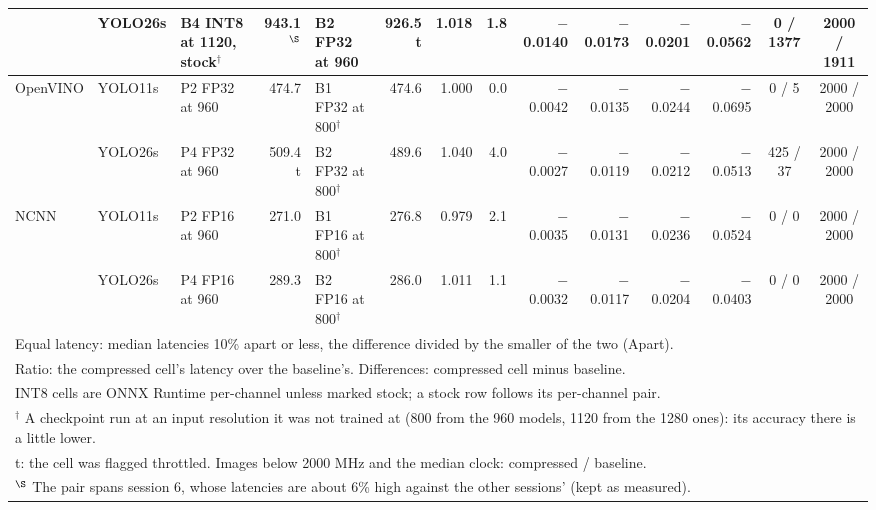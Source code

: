 \begin{tabular}{lllrlrrrrrrrcc}
 & YOLO26s & B4 INT8 at 1120, stock$^{\dagger}$ & 943.1$^{\S}$ & B2 FP32 at 960 & 926.5 t & 1.018 & 1.8 & $-$0.0140 & $-$0.0173 & $-$0.0201 & $-$0.0562 & 0 / 1377 & 2000 / 1911 \\
\midrule
OpenVINO & YOLO11s & P2 FP32 at 960 & 474.7 & B1 FP32 at 800$^{\dagger}$ & 474.6 & 1.000 & 0.0 & $-$0.0042 & $-$0.0135 & $-$0.0244 & $-$0.0695 & 0 / 5 & 2000 / 2000 \\
 & YOLO26s & P4 FP32 at 960 & 509.4 t & B2 FP32 at 800$^{\dagger}$ & 489.6 & 1.040 & 4.0 & $-$0.0027 & $-$0.0119 & $-$0.0212 & $-$0.0513 & 425 / 37 & 2000 / 2000 \\
\midrule
NCNN & YOLO11s & P2 FP16 at 960 & 271.0 & B1 FP16 at 800$^{\dagger}$ & 276.8 & 0.979 & 2.1 & $-$0.0035 & $-$0.0131 & $-$0.0236 & $-$0.0524 & 0 / 0 & 2000 / 2000 \\
 & YOLO26s & P4 FP16 at 960 & 289.3 & B2 FP16 at 800$^{\dagger}$ & 286.0 & 1.011 & 1.1 & $-$0.0032 & $-$0.0117 & $-$0.0204 & $-$0.0403 & 0 / 0 & 2000 / 2000 \\
\bottomrule
\multicolumn{14}{l}{\footnotesize Equal latency: median latencies 10\% apart or less, the difference divided by the smaller of the two (Apart).} \\
\multicolumn{14}{l}{\footnotesize Ratio: the compressed cell's latency over the baseline's. Differences: compressed cell minus baseline.} \\
\multicolumn{14}{l}{\footnotesize INT8 cells are ONNX Runtime per-channel unless marked stock; a stock row follows its per-channel pair.} \\
\multicolumn{14}{l}{\footnotesize $^{\dagger}$ A checkpoint run at an input resolution it was not trained at (800 from the 960 models, 1120 from the 1280 ones): its accuracy there is a little lower.} \\
\multicolumn{14}{l}{\footnotesize t: the cell was flagged throttled. Images below 2000 MHz and the median clock: compressed / baseline.} \\
\multicolumn{14}{l}{\footnotesize $^{\S}$ The pair spans session 6, whose latencies are about 6\% high against the other sessions' (kept as measured).} \\
\end{tabular}
